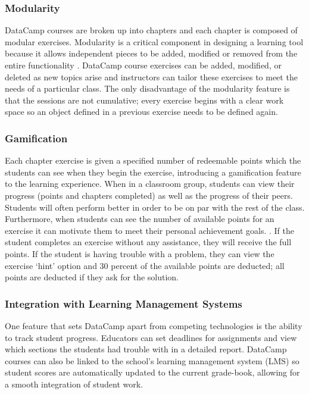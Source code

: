 \documentclass[12pt]{article}\usepackage[]{graphicx}\usepackage[]{color}
\begin{document}
\subsubsection{Modularity}
DataCamp courses are broken up into chapters and each chapter is composed of modular exercises. Modularity is a critical component in designing a
learning tool because it allows independent pieces to be added, modified or removed from the entire functionality
\citep{Hare2017}. DataCamp course exercises can be added, modified, or deleted as new topics arise and instructors can tailor
these exercises to meet the needs of a particular class. The only disadvantage of the modularity feature is that the sessions
are not cumulative; every exercise begins with a clear work space so an object defined in a previous exercise needs to be
defined again.

\subsubsection{Gamification}
Each chapter exercise is given a specified number of redeemable points which the students can see when they begin
the exercise, introducing a gamification feature to the learning experience. When in a classroom group, students can view their
progress (points and chapters completed) as well as the progress of their peers. Students will often perform better
in order to be on par with the rest of the class. Furthermore, when students can see the number of available points
for an exercise it can motivate them to meet their personal achievement goals. \citep{Chang2016}. If the student completes an exercise without
any assistance, they will receive the full points. If the student is having trouble with a problem, they can view the exercise `hint' option and 30 percent
of the available points are deducted; all points are deducted if they ask for the solution. 

\subsubsection{Integration with Learning Management Systems}
One feature that sets DataCamp apart from competing technologies is the ability to track student progress. Educators
can set deadlines for assignments and view which sections the
students had trouble with in a detailed report. DataCamp courses can also be linked to the school's learning management system (LMS) so student scores are automatically updated to the
current grade-book, allowing for a smooth integration of student work.
\end{document}
